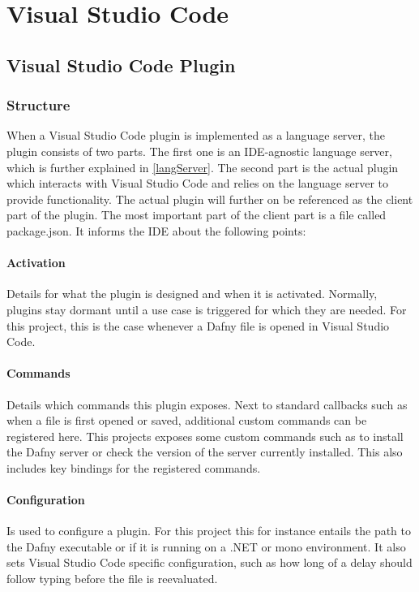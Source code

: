 \section{Visual Studio Code}

\subsection{Visual Studio Code Plugin}
\subsubsection{Structure}
When a Visual Studio Code plugin is implemented as a language server, the plugin consists of two parts. The first one is an IDE-agnostic language server, which is further explained in \ref{langServer}. The second part is the actual plugin which interacts with Visual Studio Code and relies on the language server to provide functionality. \newline
The actual plugin will further on be referenced as the client part of the plugin. The most important part of the client part is a file called package.json. It informs the IDE about the following points:
\paragraph{Activation}
Details for what the plugin is designed and when it is activated. Normally, plugins stay dormant until a use case is triggered for which they are needed. For this project, this is the case whenever a Dafny file is opened in Visual Studio Code.

\paragraph{Commands}
Details which commands this plugin exposes. Next to standard callbacks such as when a file is first opened or saved, additional custom commands can be registered here. This projects exposes some custom commands such as to install the Dafny server or check the version of the server currently installed. This also includes key bindings for the registered commands.

\paragraph{Configuration}
Is used to configure a plugin. For this project this for instance entails the path to the Dafny executable or if it is running on a .NET or mono environment. It also sets Visual Studio Code specific configuration, such as how long of a delay should follow typing before the file is reevaluated.

